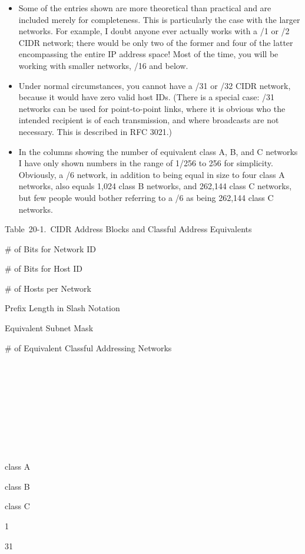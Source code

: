 \begin{itemize}
\item
  Some of the entries shown are more theoretical than practical and are
  included merely for completeness. This is particularly the case with
  the larger networks. For example, I doubt anyone ever actually works
  with a /1 or /2 CIDR network; there would be only two of the former
  and four of the latter encompassing the entire IP address space! Most
  of the time, you will be working with smaller networks, /16 and below.
\item
  Under normal circumstances, you cannot have a /31 or /32 CIDR network,
  because it would have zero valid host IDs. (There is a special case:
  /31 networks can be used for point-to-point links, where it is obvious
  who the intended recipient is of each transmission, and where
  broadcasts are not necessary. This is described in RFC 3021.)
\item
  In the columns showing the number of equivalent class A, B, and C
  networks I have only shown numbers in the range of 1/256 to 256 for
  simplicity. Obviously, a /6 network, in addition to being equal in
  size to four class A networks, also equals 1,024 class B networks, and
  262,144 class C networks, but few people would bother referring to a
  /6 as being 262,144 class C networks.
\end{itemize}

\protect\hypertarget{ch20s03.htmlux5cux23cidr_address_blocks_and_classful_address}{}{}

Table~20-1.~CIDR Address Blocks and Classful Address Equivalents

\# of Bits for Network ID

\# of Bits for Host ID

\# of Hosts per Network

Prefix Length in Slash Notation

Equivalent Subnet Mask

\# of Equivalent Classful
\protect\hypertarget{ch20s03.htmlux5cux23idx-CHP-20-0771}{}{}Addressing
Networks

~

~

~

~

~

class A

class B

class C

1

31

